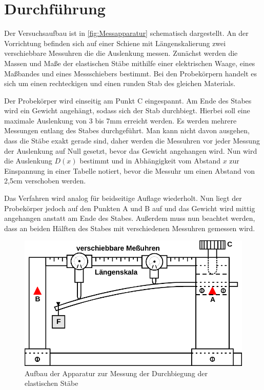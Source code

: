 \section{Durchführung}
\label{sec:Durchführung}

Der Versuchsaufbau ist in \autoref{fig:Messapparatur} schematisch dargestellt.
An der Vorrichtung befinden sich auf einer Schiene mit Längenskalierung zwei verschiebbare Messuhren die die Auslenkung messen.
Zunächst werden die Massen und Maße der elastischen Stäbe mithilfe einer elektrischen Waage, eines Maßbandes und eines Messschiebers bestimmt.
Bei den Probekörpern handelt es sich um einen rechteckigen und einen runden Stab des gleichen Materials.


Der Probekörper wird einseitig am Punkt C eingespannt. 
Am Ende des Stabes wird ein Gewicht angehängt, sodass sich der Stab durchbiegt. 
Hierbei soll eine maximale Auslenkung von 3 bis 7mm erreicht werden.
Es werden mehrere Messungen entlang des Stabes durchgeführt.
Man kann nicht davon ausgehen, dass die Stäbe exakt gerade sind, daher werden die Messuhren vor jeder Messung der Auslenkung auf Null gesetzt,
bevor das Gewicht angehangen wird.
Nun wird die Auslenkung $D(x)$ bestimmt und in Abhängigkeit vom Abstand $x$ zur Einspannung in einer Tabelle notiert, 
bevor die Messuhr um einen Abstand von 2,5cm verschoben werden.

Das Verfahren wird analog für beidseitige Auflage wiederholt. Nun liegt der Probekörper jedoch auf den Punkten A und B auf und das Gewicht wird mittig 
angehangen anstatt am Ende des Stabes. Außerdem muss nun beachtet werden, dass an beiden Hälften des Stabes mit verschiedenen Messuhren gemessen wird.




\begin{figure}
    \centering
    \includegraphics{content/Messapparat.pdf}
    \caption{Aufbau der Apparatur zur Messung der Durchbiegung der elastischen Stäbe\cite[111]{V103}}
    \label{fig:Messapparatur}
  \end{figure}